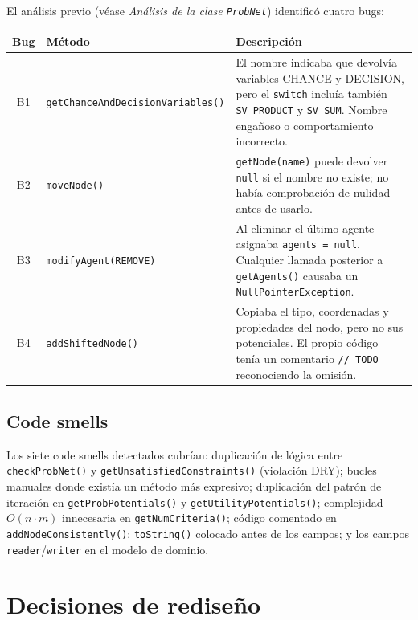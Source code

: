 \documentclass[11pt,a4paper]{article}
\newcommand{\code}[1]{\texttt{#1}}
\begin{document}
El análisis previo (véase \emph{Análisis de la clase \code{ProbNet}})
identificó cuatro bugs:

\begin{center}
\begin{tabular}{clp{9cm}}
\toprule
\textbf{Bug} & \textbf{Método} & \textbf{Descripción} \\
\midrule
B1 & \code{getChanceAndDecisionVariables()} &
     El nombre indicaba que devolvía variables CHANCE y DECISION, pero el
     \code{switch} incluía también \code{SV\_PRODUCT} y \code{SV\_SUM}.
     Nombre engañoso o comportamiento incorrecto. \\
B2 & \code{moveNode()} &
     \code{getNode(name)} puede devolver \code{null} si el nombre no
     existe; no había comprobación de nulidad antes de usarlo. \\
B3 & \code{modifyAgent(REMOVE)} &
     Al eliminar el último agente asignaba \code{agents = null}.
     Cualquier llamada posterior a \code{getAgents()} causaba un
     \code{NullPointerException}. \\
B4 & \code{addShiftedNode()} &
     Copiaba el tipo, coordenadas y propiedades del nodo, pero no sus
     potenciales. El propio código tenía un comentario \code{// TODO}
     reconociendo la omisión. \\
\bottomrule
\end{tabular}
\end{center}

\subsection{Code smells}
\label{sec:smells}

Los siete code smells detectados cubrían: duplicación de lógica entre
\code{checkProbNet()} y \code{getUnsatisfiedConstraints()} (violación DRY);
bucles manuales donde existía un método más expresivo; duplicación del
patrón de iteración en \code{getProbPotentials()} y
\code{getUtilityPotentials()}; complejidad $O(n \cdot m)$ innecesaria en
\code{getNumCriteria()}; código comentado en \code{addNodeConsistently()};
\code{toString()} colocado antes de los campos; y los campos
\code{reader}/\code{writer} en el modelo de dominio.

\section{Decisiones de rediseño}
\label{sec:decisiones}
\end{document}
